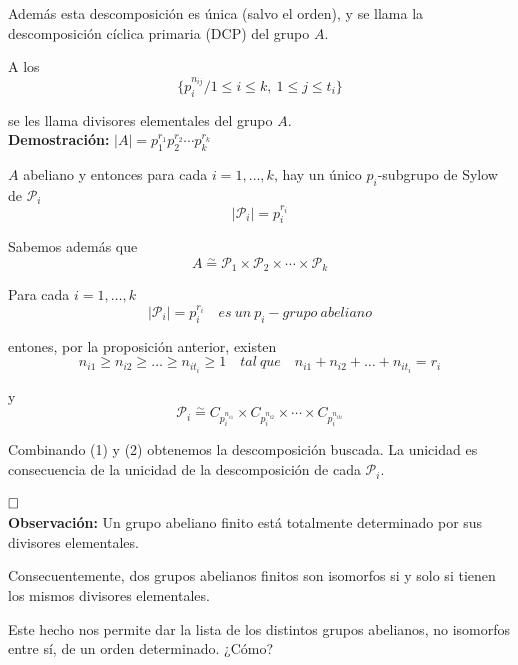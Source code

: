 \documentclass{article}
\begin{document}
Además esta descomposición es única (salvo el orden), y se llama la descomposición cíclica primaria (DCP) del grupo $A$.

A los
\begin{equation*}
\{p_i^{n_{ij}} / 1\leq i\leq k,\: 1\leq j\leq t_i\}
\end{equation*}

se les llama divisores elementales del grupo $A$. \\

\textbf{Demostración:} $|A|=p_1^{r_1}p_2^{r_2}\cdots p_k^{r_k}$

$A$ abeliano y entonces para cada $i=1,\ldots,k$, hay un único $p_i$-subgrupo de Sylow de $\mathcal{P}_i$
\begin{equation*}
|\mathcal{P}_i|=p_i^{r_i}
\end{equation*}

Sabemos además que
\begin{equation*}
A\overset{\sim}{=}\mathcal{P}_1\times \mathcal{P}_2\times \cdots \times \mathcal{P}_k \tag{1}
\end{equation*}

Para cada $i=1,\ldots,k$
\begin{equation*}
|\mathcal{P}_i|=p_i^{r_i}\quad es\:un\:p_i-grupo\:abeliano
\end{equation*}

entones, por la proposición anterior, existen
\begin{equation*}
n_{i1}\geq n_{i2}\geq \ldots \geq n_{it_i}\geq 1\quad tal\:que\quad n_{i1}+n_{i2}+\ldots + n_{it_i}=r_i
\end{equation*}

y 
\begin{equation}
\mathcal{P}_i\overset{\sim}{=}C_{p_i^{n_{i1}}}\times C_{p_i^{n_{i2}}}\times \cdots \times C_{p_i^{n_{iti}}}\tag{2}
\end{equation}

Combinando (1) y (2) obtenemos la descomposición buscada. La unicidad es consecuencia de la unicidad de la descomposición de cada $\mathcal{P}_i$.

$\hfill\square$\\

\textbf{Observación:} Un grupo abeliano finito está totalmente determinado por sus divisores elementales.

Consecuentemente, dos grupos abelianos finitos son isomorfos si y solo si tienen los mismos divisores elementales. 

Este hecho nos permite dar la lista de los distintos grupos abelianos, no isomorfos entre sí, de un orden determinado. ¿Cómo?
\end{document}
